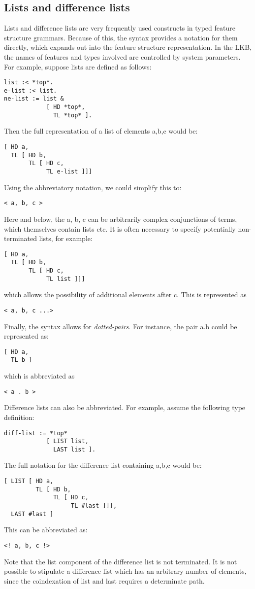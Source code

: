 \documentclass[12pt]{report}
\begin{document}
\subsection{Lists and difference lists}
\label{listdesc}

Lists and difference lists are very frequently used constructs
in typed feature structure grammars.  Because of this, the syntax
provides a notation for them directly, which expands out
into the feature structure representation.  In the LKB,
the names of features and types involved are controlled 
by system parameters.  For example, suppose lists are defined as follows:
\begin{verbatim}
list :< *top*.
e-list :< list.
ne-list := list & 
            [ HD *top*,
              TL *top* ].
\end{verbatim}
Then the full representation of a list of elements a,b,c would be:
\begin{verbatim}
[ HD a,
  TL [ HD b,
       TL [ HD c,
            TL e-list ]]]
\end{verbatim}
Using the abbreviatory notation, we could simplify this to:
\begin{verbatim}
< a, b, c >
\end{verbatim}
Here and below,
the a, b, c can be arbitrarily complex conjunctions of terms, which themselves
contain lists etc.
It is often necessary to specify potentially non-terminated lists, for example:
\begin{verbatim}
[ HD a,
  TL [ HD b,
       TL [ HD c,
            TL list ]]]
\end{verbatim}
which allows the possibility of additional elements after c.  This is represented
as 
\begin{verbatim}
< a, b, c ...>
\end{verbatim}
Finally, the syntax allows for {\it dotted-pairs}.  For instance, the pair
a.b could be represented as:
\begin{verbatim}
[ HD a,
  TL b ]
\end{verbatim}
which is abbreviated as
\begin{verbatim}
< a . b >
\end{verbatim}

Difference lists can also be abbreviated.  For example,
assume the following type definition:
\begin{verbatim}
diff-list := *top*
            [ LIST list,
              LAST list ].
\end{verbatim}
The full notation for the difference list containing a,b,c would be:
\begin{verbatim}
[ LIST [ HD a,
         TL [ HD b,
              TL [ HD c,
                   TL #last ]]],
  LAST #last ]
\end{verbatim}
This can be abbreviated as:
\begin{verbatim}
<! a, b, c !>
\end{verbatim}
Note that the list component of the difference list is not terminated.
It is not possible to stipulate a difference list which has an arbitrary
number of elements, since the coindexation of {\sc list}
and {\sc last} requires a determinate
path.
\end{document}
